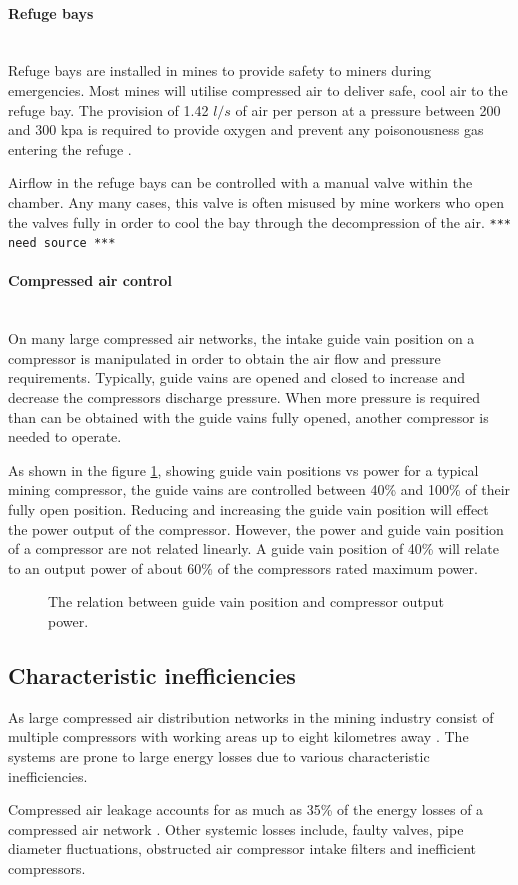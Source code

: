 \paragraph*{Refuge bays}\leavevmode\\
Refuge bays are installed in mines to provide safety to miners during emergencies. Most mines will utilise compressed air to deliver safe, cool air to the refuge bay. The provision of 1.42 $l/s$ of air per person at a pressure between 200 and 300 \gls{kpa} is required to provide oxygen and prevent any poisonousness gas entering the refuge \cite{brake1999criteria}.\par
Airflow in the refuge bays can be controlled with a manual valve within the chamber. Any many cases, this valve is often misused by mine workers who open the valves fully in order to cool the bay through the decompression of the air. \texttt{*** need source ***}
\paragraph*{Compressed air control}\leavevmode\\
On many large compressed air networks, the intake guide vain position on a compressor is manipulated in order to obtain the air flow and pressure requirements. Typically, guide vains are opened and closed to increase and decrease the compressors discharge pressure. When more pressure is required than can be obtained with the guide vains fully opened, another compressor is needed to operate.\par
 As shown in the figure \ref{fig: Guide vain position}, showing guide vain positions vs power for a typical mining compressor, the guide vains are controlled between 40\% and 100\% of their fully open position. Reducing and increasing the guide vain position will effect the power output of the compressor. However,  the power and guide vain position of a compressor are not related linearly. A guide vain position of 40\% will relate to an output power of about 60\% of the compressors rated maximum power.
 	\begin{figure}[h]
 	\centering
 	\fbox{}
 	\caption[The relation between guide vain position and compressor output power.]{The relation between guide vain position and compressor output power.}
 	\label{fig: Guide vain position}
 \end{figure}
 
	\subsection{Characteristic inefficiencies}
	As large compressed air distribution networks in the mining industry consist of multiple compressors with working areas up to eight kilometres away \cite{Marais2012PhD}. The systems are prone to large energy losses due to various characteristic inefficiencies. \par 
	Compressed air leakage accounts for as much as 35\% of the energy losses of a compressed air network \cite{Lawrence2004Improving}. Other systemic losses include, faulty valves, pipe diameter fluctuations, obstructed air compressor intake filters and inefficient compressors. \par
